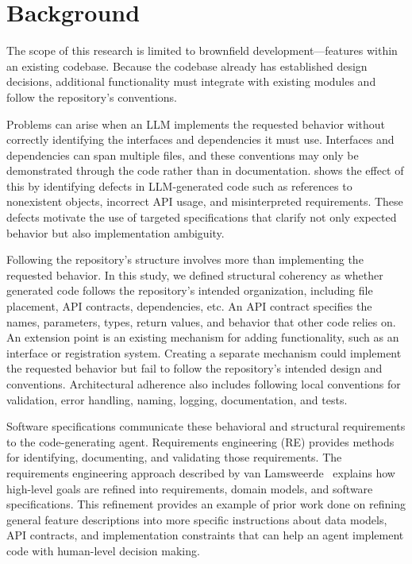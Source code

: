 \documentclass[sigconf,nonacm]{acmart}
\begin{document}
\section{Background}

The scope of this research is limited to brownfield development---features within an existing codebase. Because the codebase already has established design decisions, additional functionality must integrate with existing modules and follow the repository's conventions.

Problems can arise when an LLM implements the requested behavior without correctly identifying the interfaces and dependencies it must use. Interfaces and dependencies can span multiple files, and these conventions may only be demonstrated through the code rather than in documentation. \citet{tambon2025} shows the effect of this by identifying defects in LLM-generated code such as references to nonexistent objects, incorrect API usage, and misinterpreted requirements. These defects motivate the use of targeted specifications that clarify not only expected behavior but also implementation ambiguity. 

Following the repository's structure involves more than implementing the requested behavior. In this study, we defined structural coherency as whether generated code follows the repository's intended organization, including file placement, API contracts, dependencies, etc. An API contract specifies the names, parameters, types, return values, and behavior that other code relies on. An extension point is an existing mechanism for adding functionality, such as an interface or registration system. Creating a separate mechanism could implement the requested behavior but fail to follow the repository's intended design and conventions. Architectural adherence also includes following local conventions for validation, error handling, naming, logging, documentation, and tests.

Software specifications communicate these behavioral and structural requirements to the code-generating agent. Requirements engineering (RE) provides methods for identifying, documenting, and validating those requirements. The requirements engineering approach described by van Lamsweerde~\citep{vanlamsweerde2009} explains how high-level goals are refined into requirements, domain models, and software specifications. This refinement provides an example of prior work done on refining general feature descriptions into more specific instructions about data models, API contracts, and implementation constraints that can help an agent implement code with human-level decision making.
\end{document}
